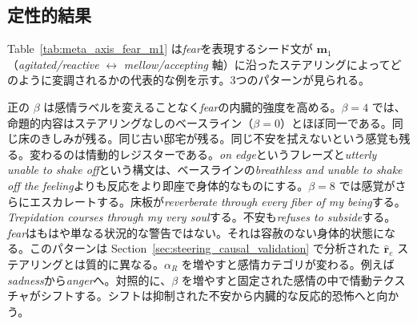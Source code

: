 
\subsection{定性的結果}
\label{sec:ch2-meta-axis-qualitative}

Table~\ref{tab:meta_axis_fear_m1} は\textit{fear}を表現するシード文が $\mathbf{m}_1$（\textit{agitated/reactive} $\leftrightarrow$ \textit{mellow/accepting} 軸）に沿ったステアリングによってどのように変調されるかの代表的な例を示す。3つのパターンが見られる。\par

正の $\beta$ は感情ラベルを変えることなく\textit{fear}の内臓的強度を高める。$\beta=4$ では、命題的内容はステアリングなしのベースライン（$\beta=0$）とほぼ同一である。同じ床のきしみが残る。同じ古い邸宅が残る。同じ不安を拭えないという感覚も残る。変わるのは情動的レジスターである。\textit{on edge}というフレーズと\textit{utterly unable to shake off}という構文は、ベースラインの\textit{breathless and unable to shake off the feeling}よりも反応をより即座で身体的なものにする。$\beta=8$ では感覚がさらにエスカレートする。床板が\textit{reverberate through every fiber of my being}する。\textit{Trepidation courses through my very soul}する。不安も\textit{refuses to subside}する。\textit{fear}はもはや単なる状況的な警告ではない。それは容赦のない身体的状態になる。このパターンは Section~\ref{sec:steering_causal_validation} で分析された $\hat{\mathbf{r}}_e$ ステアリングとは質的に異なる。$\alpha_R$ を増やすと感情カテゴリが変わる。例えば\textit{sadness}から\textit{anger}へ。対照的に、$\beta$ を増やすと固定された感情の中で情動テクスチャがシフトする。シフトは抑制された不安から内臓的な反応的恐怖へと向かう。\par

